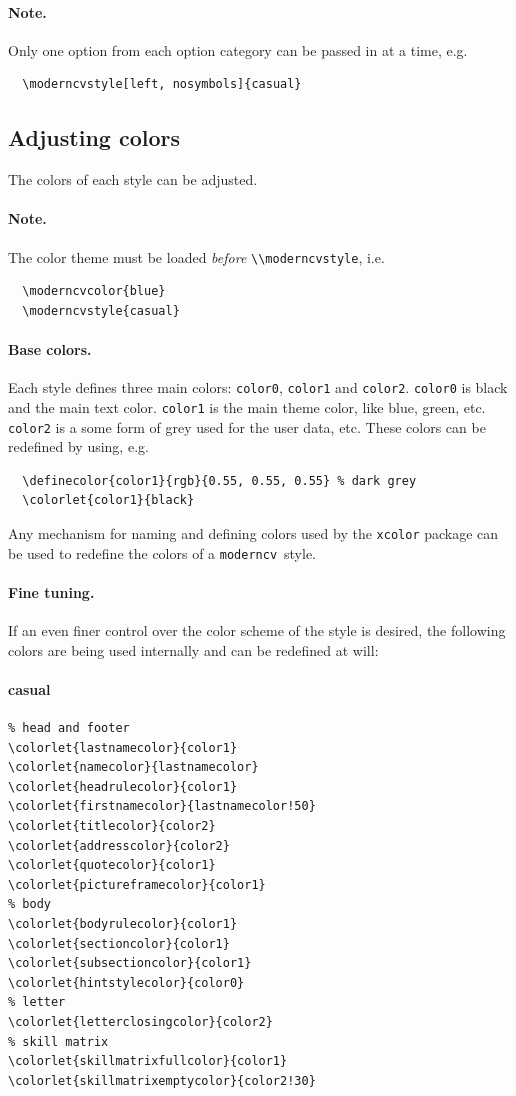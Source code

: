 \documentclass[a4paper, 11pt]{article}
\newcommand{\code}[1]{\lstinline!#1!}
\newcommand{\moderncv}{\code{moderncv}}
\newcommand{\Moderncv}{\moderncv~}
\begin{document}
\paragraph{Note.}
Only one option from each option category can be passed in at a time, e.g.
\begin{lstlisting}
  \moderncvstyle[left, nosymbols]{casual}
\end{lstlisting}


\subsection{Adjusting colors}
The colors of each style can be adjusted.

\paragraph{Note.}
The color theme must be loaded \emph{before} \code{\\moderncvstyle}, i.e.
\begin{lstlisting}
  \moderncvcolor{blue}
  \moderncvstyle{casual}
\end{lstlisting}

\paragraph{Base colors.}
Each style defines three main colors: \code{color0}, \code{color1} and \code{color2}.
\code{color0} is black and the main text color.
\code{color1} is the main theme color, like blue, green, etc.
\code{color2} is a some form of grey used for the user data, etc.
These colors can be redefined by using, e.g.
\begin{lstlisting}
  \definecolor{color1}{rgb}{0.55, 0.55, 0.55} % dark grey
  \colorlet{color1}{black}
\end{lstlisting}
Any mechanism for naming and defining colors used by the \code{xcolor} package can be used to redefine the colors of a \Moderncv style.

\paragraph{Fine tuning.}
If an even finer control over the color scheme of the style is desired, the following colors are being used internally and can be redefined at will:

\paragraph{casual}
\begin{lstlisting}
% head and footer
\colorlet{lastnamecolor}{color1}
\colorlet{namecolor}{lastnamecolor}
\colorlet{headrulecolor}{color1}
\colorlet{firstnamecolor}{lastnamecolor!50}
\colorlet{titlecolor}{color2}
\colorlet{addresscolor}{color2}
\colorlet{quotecolor}{color1}
\colorlet{pictureframecolor}{color1}
% body
\colorlet{bodyrulecolor}{color1}
\colorlet{sectioncolor}{color1}
\colorlet{subsectioncolor}{color1}
\colorlet{hintstylecolor}{color0}
% letter
\colorlet{letterclosingcolor}{color2}
% skill matrix
\colorlet{skillmatrixfullcolor}{color1}
\colorlet{skillmatrixemptycolor}{color2!30}
\end{lstlisting}
\end{document}

